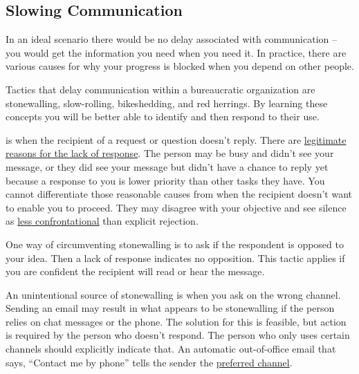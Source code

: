 \subsection*{Slowing Communication\label{sec:slowing-communication}}

In an ideal scenario there would be no delay associated with communication -- you would get the information you need when you need it. In practice, there are various causes for why your progress is blocked when you depend on other people. 

Tactics that delay communication within a bureaucratic organization are stonewalling, slow-rolling, bikeshedding, and red herrings. By learning these concepts you will be better able to identify and then respond to their use.

\iftoggle{glossaryinmargin}{\marginpar{[Glossary]}}{}
\iftoggle{glossarysubstitutionworks}{\Gls{stonewalling}}{Stonewalling} 
is when the recipient of a request or question  doesn't reply. There are \hyperref[sec:email-responsiveness]{legitimate reasons for the lack of response}. 
The person may be busy and didn't see your message, or they did see your message but didn't have a chance to reply yet because a response to you is lower priority than other tasks they have. You cannot differentiate those reasonable causes from when the recipient doesn't want to enable you to proceed. They may disagree with your objective and see silence as \href{https://en.wikipedia.org/wiki/Passive-aggressive_behavior}{less confrontational}
\iftoggle{WPinmargin}{\marginpar{[Wikipedia] Passive-\\aggressive behavior}}{}
than explicit rejection. 

One way of circumventing stonewalling is to ask if the respondent is opposed to your idea. 
Then a lack of response indicates no opposition. This tactic applies if you are confident the recipient will read or hear the message.

An unintentional source of stonewalling is when you ask on the wrong channel. Sending an email may result in what appears to be stonewalling if the person relies on chat messages or the phone. The solution for this 
is feasible, but action is required by the person who doesn't respond. The person who only uses certain channels should explicitly indicate that. An automatic out-of-office email that says, ``Contact me by phone'' tells the sender the \hyperref[sec:communication-preferences]{preferred channel}. 

